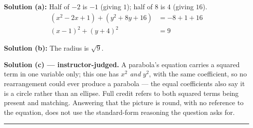 \documentclass[12pt]{article}
\begin{document}
\textbf{Solution (a):} Half of $-2$ is $-1$ (giving $1$); half of $8$ is $4$ (giving $16$).
\begin{align*}
  (x^2 - 2x + 1) + (y^2 + 8y + 16) &= -8 + 1 + 16 \\
  (x - 1)^2 + (y + 4)^2 &= 9
\end{align*}

\textbf{Solution (b):} The radius is $\sqrt{9}$. 

\vspace{0.15cm}
\textbf{Solution (c) --- instructor-judged.} A parabola's equation carries a squared term in
one variable only; this one has $x^2$ \emph{and} $y^2$, with the same coefficient, so no
rearrangement could ever produce a parabola --- the equal coefficients also say it is a
circle rather than an ellipse. Full credit refers to both squared terms being present and
matching. Answering that the picture is round, with no reference to the equation, does not
use the standard-form reasoning the question asks for.

\vspace{0.2cm}\noindent\rule{\linewidth}{0.2pt}
\end{document}
